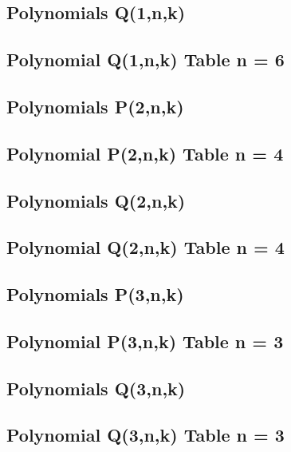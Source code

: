 \documentclass[12pt,letterpaper,oneside,reqno]{amsart}
\begin{document}
    \subsection{Polynomials Q(1,n,k)}
    

    \subsection{Polynomial Q(1,n,k) Table n = 6}
    

    \subsection{Polynomials P(2,n,k)}
    

    \subsection{Polynomial P(2,n,k) Table n = 4}
    

    \subsection{Polynomials Q(2,n,k)}
    

    \subsection{Polynomial Q(2,n,k) Table n = 4}
    

    \subsection{Polynomials P(3,n,k)}
    

    \subsection{Polynomial P(3,n,k) Table n = 3}
    

    \subsection{Polynomials Q(3,n,k)}
    

    \subsection{Polynomial Q(3,n,k) Table n = 3}
    


%    
%    
\end{document}
